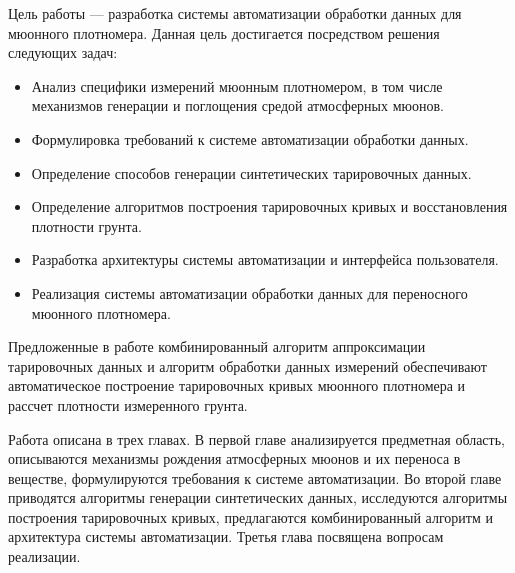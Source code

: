 
Цель работы --- разработка системы автоматизации обработки данных для мюонного плотномера. 
Данная цель достигается посредством решения следующих задач:

\begin{itemize}
 \item Анализ специфики измерений мюонным плотномером, в том числе механизмов генерации и поглощения средой атмосферных мюонов.
 \item Формулировка требований к системе автоматизации обработки данных.
 \item Определение способов генерации синтетических тарировочных данных. 
 \item Определение алгоритмов построения тарировочных кривых и  восстановления плотности грунта.
 \item Разработка архитектуры системы автоматизации и интерфейса пользователя.
 \item Реализация системы автоматизации обработки данных для переносного мюонного плотномера.
\end{itemize}

Предложенные в работе комбинированный алгоритм аппроксимации тарировочных данных и алгоритм обработки данных измерений
обеспечивают автоматическое построение тарировочных кривых мюонного плотномера и рассчет плотности измеренного грунта.

Работа описана в трех главах. В первой главе анализируется предметная область, описываются механизмы рождения атмосферных мюонов и их переноса в веществе,
 формулируются требования к системе автоматизации. Во второй главе приводятся алгоритмы генерации синтетических данных, 
 исследуются  алгоритмы построения тарировочных кривых, предлагаются комбинированный алгоритм и архитектура системы автоматизации.
 Третья глава посвящена вопросам реализации. 

\clearpage